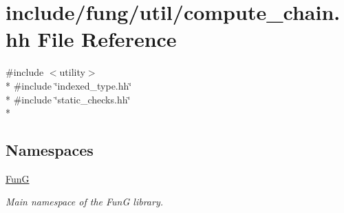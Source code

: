 \hypertarget{compute__chain_8hh}{\section{include/fung/util/compute\-\_\-chain.hh File Reference}
\label{compute__chain_8hh}
}
{\ttfamily \#include $<$utility$>$}\\*
{\ttfamily \#include \char`\"{}indexed\-\_\-type.\-hh\char`\"{}}\\*
{\ttfamily \#include \char`\"{}static\-\_\-checks.\-hh\char`\"{}}\\*
\subsection*{Namespaces}
\begin{DoxyCompactItemize}
\item 
\hyperlink{namespaceFunG}{Fun\-G}
\begin{DoxyCompactList}\small\item\em Main namespace of the Fun\-G library. \end{DoxyCompactList}\end{DoxyCompactItemize}
